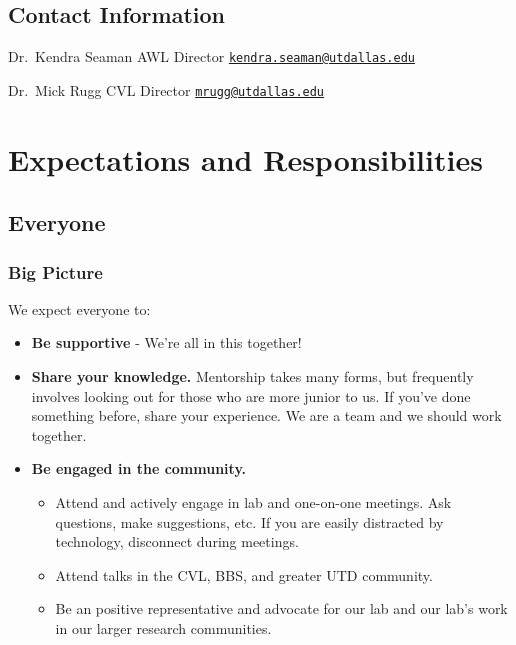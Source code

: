 \documentclass[
]{book}
\providecommand{\tightlist}{%
  \setlength{\itemsep}{0pt}\setlength{\parskip}{0pt}}
\begin{document}
\hypertarget{contact-information}{%
\section{Contact Information}\label{contact-information}}

Dr.~Kendra Seaman
AWL Director
\href{mailto:kendra.seaman@utdallas.edu}{\nolinkurl{kendra.seaman@utdallas.edu}}

Dr.~Mick Rugg
CVL Director
\href{mailto:mrugg@utdallas.edu}{\nolinkurl{mrugg@utdallas.edu}}

\hypertarget{expectations-and-responsibilities}{%
\chapter{Expectations and Responsibilities}\label{expectations-and-responsibilities}}

\hypertarget{everyone}{%
\section{Everyone}\label{everyone}}

\hypertarget{big-picture}{%
\subsection{Big Picture}\label{big-picture}}

We expect everyone to:

\begin{itemize}
\tightlist
\item
  \textbf{Be supportive} - We're all in this together!\\
\item
  \textbf{Share your knowledge.} Mentorship takes many forms, but frequently involves looking out for those who are more junior to us. If you've done something before, share your experience. We are a team and we should work together.
\item
  \textbf{Be engaged in the community.}

  \begin{itemize}
  \tightlist
  \item
    Attend and actively engage in lab and one-on-one meetings. Ask questions, make suggestions, etc. If you are easily distracted by technology, disconnect during meetings.\\
  \item
    Attend talks in the CVL, BBS, and greater UTD community.\\
  \item
    Be an positive representative and advocate for our lab and our lab's work in our larger research communities.
  \end{itemize}
\end{itemize}
\end{document}
